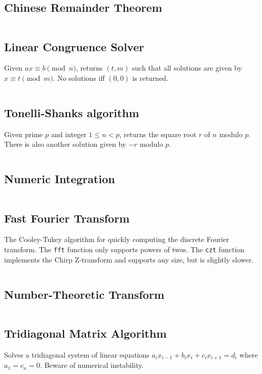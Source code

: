 \documentclass[8pt,a4paper,landscape,oneside]{amsart}
\newcommand{\code}[1]{\inputminted[fontsize=\normalsize,baselinestretch=1]{cpp}{_code/#1}}
\newif\ifverbose
\begin{document}
\begin{multicols*}{3}
    \subsection{Chinese Remainder Theorem}
        \ifverbose
        An implementation of the Chinese Remainder Theorem.
        \fi
        \code{mathematics/crt.cpp}

    \subsection{Linear Congruence Solver}
        Given $ax \equiv b \pmod{n}$, returns $(t,m)$ such that all solutions
        are given by $x\equiv t\pmod{m}$. No solutions iff $(0,0)$ is returned.
        \code{mathematics/linear_congruence.cpp}

    \subsection{Tonelli-Shanks algorithm}
        Given prime $p$ and integer $1\leq n<p$, returns the square root $r$ of
        $n$ modulo $p$. There is also another solution given by $-r$ modulo
        $p$.
        \code{mathematics/tonelli_shanks.cpp}

    \subsection{Numeric Integration}
        \ifverbose
        Numeric integration using Simpson's rule.
        \fi
        \code{mathematics/numeric_integration.cpp}

    \subsection{Fast Fourier Transform}
        The Cooley-Tukey algorithm for quickly computing the discrete Fourier
        transform. The \texttt{fft} function only supports powers of twos. The
        \texttt{czt} function implements the Chirp Z-transform and supports any
        size, but is slightly slower.
        \code{mathematics/fft.cpp}
    \subsection{Number-Theoretic Transform}
        \code{mathematics/ntt.cpp}

    \subsection{Tridiagonal Matrix Algorithm}
        Solves a tridiagonal system of linear equations $a_ix_{i-1} + b_ix_i +
        c_ix_{i+1} = d_i$ where $a_1 = c_n = 0$. Beware of numerical
        instability.
        \code{mathematics/tridiagonal.cpp}


\end{multicols*}
\end{document}
